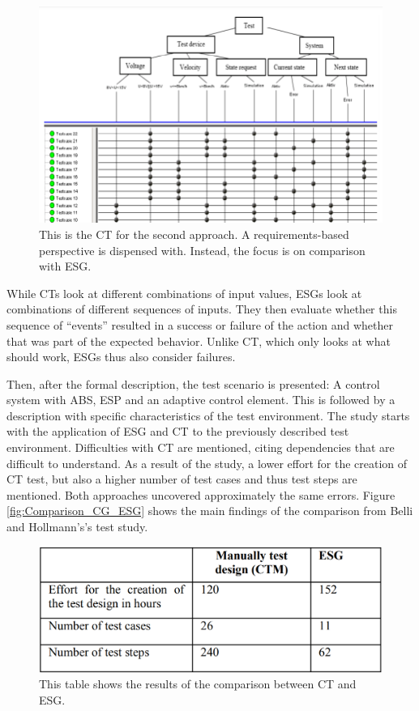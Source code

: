 \begin{figure}[H]
\centering
\includegraphics[scale=0.6]{../../individual/groeger/images/ClassificationTreeExample2.png} 
\caption{This is the CT for the second approach. A requirements-based perspective is dispensed with. Instead, the focus is on comparison with ESG.}
\label{fig:Approach2_CT}
\end{figure}

While CTs look at different combinations of input values, ESGs look at combinations of different sequences of inputs. They then evaluate whether this sequence of \enquote{events} resulted in a success or failure of the action and whether that was part of the expected behavior. Unlike CT, which only looks at what should work, ESGs thus also consider failures.

Then, after the formal description, the test scenario is presented: A control system with ABS, ESP and an adaptive control element. This is followed by a description with specific characteristics of the test environment. The study starts with the application of ESG and CT to the previously described test environment. Difficulties with CT are mentioned, citing dependencies that are difficult to understand. As a result of the study, a lower effort for the creation of CT test, but also a higher number of test cases and thus test steps are mentioned. Both approaches uncovered approximately the same errors. Figure \autoref{fig:Comparison_CG_ESG} shows the main findings of the comparison from Belli and Hollmann's\cite{Belli}'s test study.

\begin{figure}[H]
\centering
\includegraphics[scale=0.4]{../../individual/groeger/images/Comparison_CG_ESG.png} 
\caption{This table shows the results of the comparison between CT and ESG.}
\label{fig:Comparison_CG_ESG}
\end{figure}

